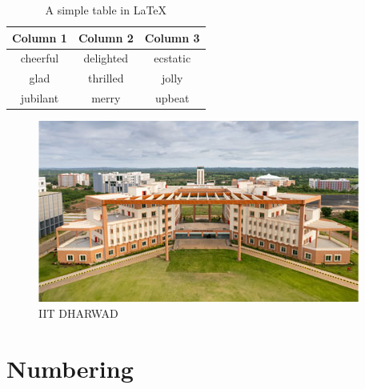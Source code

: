 \documentclass[12pt,a4paper]{article}
\begin{document}
	\begin{table}[h]
		\centering
		\begin{tabular}{|c|c|c|} 
			\hline
			Column 1 & Column 2 & Column 3 \\ 
			\hline
			cheerful & delighted & ecstatic \\ 
			\hline
			glad & thrilled & jolly \\ 
			\hline
			jubilant & merry & upbeat \\ 
			\hline
		\end{tabular}
		\caption{A simple table in LaTeX}
	\end{table}
	
	
\begin{figure}
	\centering
	\includegraphics[width=0.5\linewidth]{"iit dharwad"}
	\caption{IIT DHARWAD}
	\label{fig:iit-dharwad}
\end{figure}
	
	\pagebreak
	\section{Numbering}
	
\end{document}
